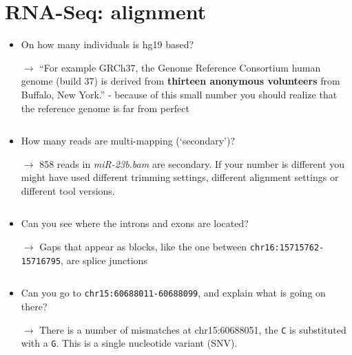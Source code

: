 \section{RNA-Seq: alignment}
\begin{itemize}
	\item On how many individuals is hg19 based?
	\item[$\rightarrow$] ``For example GRCh37, the Genome Reference Consortium human genome (build 37) is derived from \textbf{thirteen anonymous volunteers} from Buffalo, New York.'' - because of this small number you should realize that the reference genome is far from perfect
	\item[$$]
	\item How many reads are multi-mapping (`secondary')?
	\item[$\rightarrow$] 858 reads in \textit{miR-23b.bam} are secondary. If your number is different you might have used different trimming settings, different alignment settings or different tool versions.
	\item[$$]
	\item Can you see where the introns and exons are located?
	\item[$\rightarrow$] Gaps that appear as blocks, like the one between \verb|chr16:15715762-15716795|, are splice junctions
	\item[$$]
	\item Can you go to \verb|chr15:60688011-60688099|, and explain what is going on there?
	\item[$\rightarrow$] There is a number of mismatches at chr15:60688051, the \verb|C| is substituted with a \verb|G|. This is a single nucleotide variant (SNV).
\end{itemize}
